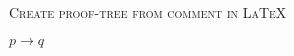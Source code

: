 \documentclass{article}
\begin{document}
\pagestyle{empty}
\enlargethispage{100cm}

\begin{center}
	\Large
	\scshape
	Create proof-tree from comment in \LaTeX
\end{center}

$p \to q$ 
\end{document}
